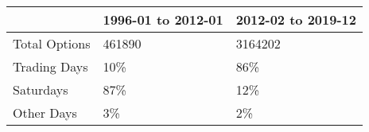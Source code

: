 \begin{tabular}{lll}
\toprule
 & 1996-01 to 2012-01 & 2012-02 to 2019-12 \\
\midrule
Total Options & 461890 & 3164202 \\
Trading Days & 10\% & 86\% \\
Saturdays & 87\% & 12\% \\
Other Days & 3\% & 2\% \\
\bottomrule
\end{tabular}
